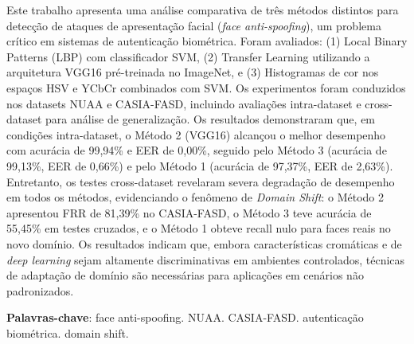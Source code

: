 \documentclass[
	article,			%
	11pt,				%
	oneside,			%
	a4paper,			%
	english,			%
	brazil,				%
	sumario=tradicional
	]{abntex2}
\begin{document}
\frenchspacing 


%
%
\maketitle

\begin{resumoumacoluna}
    Este trabalho apresenta uma análise comparativa de três métodos distintos para detecção de ataques de apresentação facial (\textit{face anti-spoofing}), um problema crítico em sistemas de autenticação biométrica. Foram avaliados: (1) Local Binary Patterns (LBP) com classificador SVM, (2) Transfer Learning utilizando a arquitetura VGG16 pré-treinada no ImageNet, e (3) Histogramas de cor nos espaços HSV e YCbCr combinados com SVM. Os experimentos foram conduzidos nos datasets NUAA e CASIA-FASD, incluindo avaliações intra-dataset e cross-dataset para análise de generalização. Os resultados demonstraram que, em condições intra-dataset, o Método 2 (VGG16) alcançou o melhor desempenho com acurácia de 99,94\% e EER de 0,00\%, seguido pelo Método 3 (acurácia de 99,13\%, EER de 0,66\%) e pelo Método 1 (acurácia de 97,37\%, EER de 2,63\%). Entretanto, os testes cross-dataset revelaram severa degradação de desempenho em todos os métodos, evidenciando o fenômeno de \textit{Domain Shift}: o Método 2 apresentou FRR de 81,39\% no CASIA-FASD, o Método 3 teve acurácia de 55,45\% em testes cruzados, e o Método 1 obteve recall nulo para faces reais no novo domínio. Os resultados indicam que, embora características cromáticas e de \textit{deep learning} sejam altamente discriminativas em ambientes controlados, técnicas de adaptação de domínio são necessárias para aplicações em cenários não padronizados.

    \vspace{\onelineskip}

    \noindent
    \textbf{Palavras-chave}: face anti-spoofing. NUAA. CASIA-FASD. autenticação biométrica. domain shift.
\end{resumoumacoluna}

\end{document}
